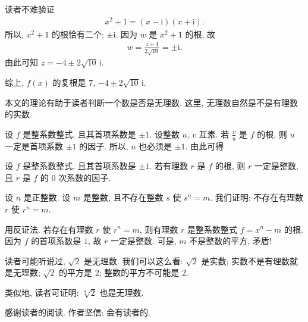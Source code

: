 \begin{example}
    读者不难验证
    \begin{align*}
        x^2 + 1 = (x - \mathrm{i}) (x + \mathrm{i}).
    \end{align*}
    所以, $x^2 + 1$ 的根恰有二个: $\pm \mathrm{i}$. 因为 $w$ 是 $x^2 + 1$ 的根, 故
    \begin{align*}
        w = \frac{z + 4}{2\sqrt{10}} = \pm \mathrm{i}.
    \end{align*}
    由此可知 $z = -4 \pm 2\sqrt{10}\,\mathrm{i}$.

    综上, $f(x)$ 的复根是 $7$, $-4 \pm 2\sqrt{10}\,\mathrm{i}$.
\end{example}

\myLine

本文的理论有助于读者判断一个数是否是无理数. 这里, 无理数自然是不是有理数的实数.

设 $f$ 是整系数整式, 且其首项系数是 $\pm 1$. 设整数 $u$, $v$ 互素. 若 $\frac{v}{u}$ 是 $f$ 的根, 则 $u$ 一定是首项系数 $\pm 1$ 的因子. 所以, $u$ 也必须是 $\pm 1$. 由此可得
\begin{proposition}
    设 $f$ 是整系数整式, 且其首项系数是 $\pm 1$. 若有理数 $r$ 是 $f$ 的根, 则 $r$ 一定是整数, 且 $r$ 是 $f$ 的 $0$ 次系数的因子.
\end{proposition}

\begin{example}
    设 $n$ 是正整数. 设 $m$ 是整数, 且不存在整数 $s$ 使 $s^n = m$. 我们证明: 不存在有理数 $r$ 使 $r^n = m$.

    用反证法. 若存在有理数 $r$ 使 $r^n = m$, 则有理数 $r$ 是整系数整式 $f = x^n - m$ 的根. 因为 $f$ 的首项系数是 $1$, 故 $r$ 一定是整数. 可是, $m$ 不是整数的平方, 矛盾!

    读者可能听说过, $\sqrt{2}$ 是无理数. 我们可以这么看: $\sqrt{2}$ 是实数; 实数不是有理数就是无理数; $\sqrt{2}$ 的平方是 $2$; 整数的平方不可能是 $2$.

    类似地, 读者可证明: $\sqrt[3]{2}$ 也是无理数.
\end{example}

感谢读者的阅读. 作者坚信: 会有读者的.

